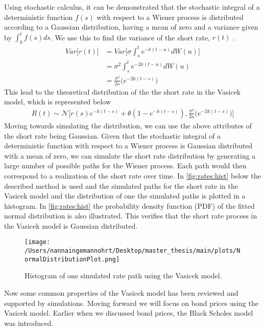 Using stochastic calculus, it can be demonstrated that the stochastic integral of a deterministic function 
$f(s)$ with respect to a Wiener process is distributed according to a Gaussian distribution,
having a mean of zero and a variance given by $\int_0^t f(s) ds$. We use this to find the variance of the short rate,
$r(t)$ \cite{Bjork}.
\begin{align*}
    Var\Big[r(t)\Big] &= Var\Big[\sigma \int_{s}^{t}e^{-k(t-u)} d W(u) \Big] \\
    &= \sigma^2 \int_{s}^{t}e^{-2k(t-u)} d W(u) \\
    &= \frac{\sigma^2}{2\kappa} \Big(e^{-2k(t-s)}\Big)
    \end{align*}
This lead to the theoretical distribution of the the short rate in the Vasicek model, which is represented below
\begin{align}
    R(t) \sim \mathcal{N} \Big[ r(s) e^{-k(t-s)} + \theta \left( 1 - e^{-k(t-s)} \right) ,
    \frac{\sigma^2}{2\kappa} \Big(e^{-2k(t-s)}\Big) \Big]
\end{align}
Moving towards simulating the distribution, we can use the above attributes of the short rate being Gaussian.
Given that the stochastic integral of a deterministic function with respect to a Wiener process is Gaussian distributed
with a mean of zero, we can simulate the short rate distribution by generating a large number of possible paths
for the Wiener process. Each path would then correspond to a realization of the short rate over time. In \autoref{fig:rates:hist}
below the described method is used and the simulated paths for the short rate in the Vasicek model and the distribution of one  the
simulated paths is plotted in a histogram. In \autoref{fig:rates:hist} the probability density function (PDF) of the 
fitted normal distribution is also illustrated. This verifies that the short rate process in the Vasicek model is Gaussian distributed.
\begin{figure}[H]
    \centering
    \texttt{[image: /Users/nannaingemannohrt/Desktop/master\_thesis/main/plots/NormalDistributionPlot.png]}
    \caption{Histogram of one simulated rate path using the Vasicek model.}
    \label{fig:rates:hist}
\end{figure}
\noindent
Now some common properties of the Vasicek model has been reviewed and supported by simulations. Moving forward we will 
focus on bond prices using the Vasicek model. Earlier when we discussed bond prices, the Black Scholes model was introduced. 
\\\\
